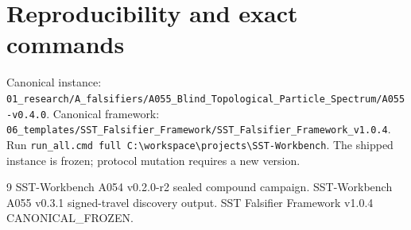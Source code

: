 \documentclass[11pt,a4paper]{article}
\newcommand{\code}[1]{\texttt{#1}}
\begin{document}
\section{Reproducibility and exact commands}
Canonical instance: \code{01\_research/A\_falsifiers/A055\_Blind\_Topological\_Particle\_Spectrum/A055-v0.4.0}. Canonical framework: \code{06\_templates/SST\_Falsifier\_Framework/SST\_Falsifier\_Framework\_v1.0.4}. Run \code{run\_all.cmd full C:\textbackslash workspace\textbackslash projects\textbackslash SST-Workbench}. The shipped instance is frozen; protocol mutation requires a new version.
\begin{thebibliography}{9} SST-Workbench A054 v0.2.0-r2 sealed compound campaign. SST-Workbench A055 v0.3.1 signed-travel discovery output. SST Falsifier Framework v1.0.4 CANONICAL\_FROZEN.\end{thebibliography}
\end{document}
